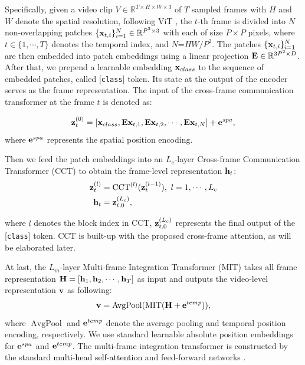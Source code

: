 \documentclass[runningheads]{llncs}
\begin{document}
Specifically, given a video clip $V \in \mathbb{R}^{T\times H \times W \times 3}$
of $T$ sampled frames with $H$ and $W$ denote the spatial resolution, following ViT \cite{dosovitskiy2020image}, the $t$-th frame is divided into $N$ non-overlapping patches $\{{\bf{x}}_{t,i}\}_{i=1}^{N} \in \mathbb{R}^{P^2\times3}$ 
with each of size $P \times P$ pixels, where $t\in\{1,\cdots,T\}$ denotes the temporal index, and $N$=$HW/P^2$. The patches $\{{\bf{x}}_{t,i}\}_{i=1}^{N}$ are then embedded into patch embeddings using a linear projection ${\bf{E}} \in \mathbb{R}^{3P^2 \times D}$. After that, we prepend a learnable embedding ${\bf{x}}_{class}$ to the sequence of embedded patches, called [\texttt{class}] token. Its state at the output of the encoder serves as the frame representation. The input of the cross-frame communication transformer at the frame $t$ is denoted as:

\begin{equation}
{\bf{z}}^{(0)}_{t} = [{\bf{x}}_{class}, {\bf{Ex}}_{t,1}, {\bf{Ex}}_{t,2}, \cdots,{\bf{Ex}}_{t,N}] + {\bf{e}}^{spa}, 
\end{equation}
where ${\bf{e}}^{spa}$ represents the spatial position encoding.

Then we feed the patch embeddings into an $L_c$-layer Cross-frame Communication Transformer (CCT) to obtain the frame-level representation ${\bf{h}}_t$:
\begin{equation}
\begin{aligned}
    {\bf{z}}^{(l)}_{t} &= \operatorname{CCT}^{(l)}({{\bf{z}}^{(l-1)}_{t}}), ~ l = 1, \cdots, L_c\\
    {\bf{h}}_t &= {\bf{z}}^{(L_c)}_{t, 0},
\end{aligned}
\end{equation}

where $l$ denotes the block index in CCT, ${\bf{z}}^{(L_c)}_{t,0}$ represents the final output of the [\texttt{class}] token. CCT is built-up with the proposed cross-frame attention, as will be elaborated later.

At last, the $L_m$-layer Multi-frame Integration Transformer (MIT) takes all frame representation ${\bf{H}} = [{\bf{h}}_1, {\bf{h}}_2, \cdots, {\bf{h}}_T] $ as input and outputs the video-level representation ${\bf{v}}$ as following:
\begin{equation}
    {\bf{v}} = \operatorname{AvgPool}(\operatorname{MIT}({\bf{H}}+{\bf{e}}^{temp})),
\end{equation}
where $\operatorname{AvgPool}$ and ${\bf{e}}^{temp}$ denote the average pooling and temporal position encoding, respectively. We use standard learnable absolute position embeddings \cite{vaswani2017attention} for ${\bf{e}}^{spa}$ and ${\bf{e}}^{temp}$. The multi-frame integration transformer is constructed by the standard \textcolor{black}{multi-head self-attention} and feed-forward networks \cite{vaswani2017attention}.
\end{document}

